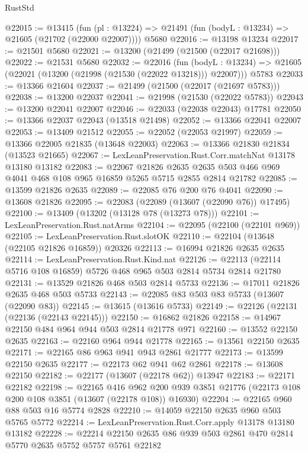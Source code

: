 \begin{lexlean}{RustStd}
\begin{coremodule}
@22015 := @13415
    (fun (pl : @13224) => @21491 (fun (bodyL : @13234) => @21605 (@21702 (@22000 @22007))))
    @5680
@22016 := @13198 @13234
@22017 := @21501 @5680
@22021 := @13200 (@21499 (@21500 (@22017 @21698)))
@22022 := @21531 @5680
@22032 := @22016
    (fun (bodyL : @13234) => @21605 (@22021 (@13200 (@21998 (@21530 (@22022 @13218))) @22007)))
    @5783
@22033 := @13366 @21604
@22037 := @21499 (@21500 (@22017 (@21697 @5783)))
@22038 := @13200 @22037
@22041 := @21998 (@21530 (@22022 @5783))
@22043 := @13200 @22041 @22007
@22046 := @22033 (@22038 @22043) @17781
@22050 := @13366 @22037 @22043 (@13518 @21498)
@22052 := @13366 @22041 @22007
@22053 := @13409 @21512
@22055 := @22052 (@22053 @21997)
@22059 := @13366 @22005 @21835 (@13648 @22003)
@22063 := @13366 @21830 @21834 (@13523 @21665)
@22067 := LexLeanPreservation.Rust.Corr.matchNat @13178 @13180 @13182
@22083 := @22067
    @21826
    @2635
    @2635
    @503
    @466
    @969
    @4041
    @468
    @108
    @965
    @16859
    @5265
    @5715
    @2855
    @2814
    @21782
@22085 := @13599 @21826 @2635
@22089 := @22085 @76 @200 @76 @4041
@22090 := @13608 @21826
@22095 := @22083 (@22089 (@13607 (@22090 @76)) @17495)
@22100 := @13409 (@13202 (@13128 @78 (@13273 @78)))
@22101 := LexLeanPreservation.Rust.natArms
@22104 := @22095 (@22100 (@22101 @969))
@22105 := LexLeanPreservation.Rust.slotOK
@22110 := @22104 (@13648 (@22105 @21826 @16859)) @20326
@22113 := @16994 @21826 @2635 @2635
@22114 := LexLeanPreservation.Rust.Kind.nat
@22126 := @22113 (@22114 @5716 @108 @16859) @5726 @468 @965 @503 @2814 @5734 @2814 @21780
@22131 := @13529 @21826 @468 @503 @2814 @5733
@22136 := @17011 @21826 @2635 @468 @503 @5733
@22143 := @22085 @83 @503 @83 @5733 (@13607 (@22090 @83))
@22145 := @13615 (@13616 @5733)
@22149 := @22126 (@22131 (@22136 (@22143 @22145)))
@22150 := @16862 @21826
@22158 := @14967 @22150 @484 @964 @944 @503 @2814 @21778 @971
@22160 := @13552 @22150 @2635
@22163 := @22160 @964 @944 @21778
@22165 := @13561 @22150 @2635
@22171 := @22165 @86 @963 @941 @943 @2861 @21777
@22173 := @13599 @22150 @2635
@22177 := @22173 @62 @941 @62 @2861
@22178 := @13608 @22150
@22182 := @22177 (@13607 (@22178 @62)) @13947
@22183 := @22171 @22182
@22198 := @22165
    @416
    @962
    @200
    @939
    @3851
    @21776
    (@22173 @108 @200 @108 @3851 (@13607 (@22178 @108)) @16930)
@22204 := @22165 @960 @88 @503 @16 @5774 @2828
@22210 := @14059 @22150 @2635 @960 @503 @5765 @5772
@22214 := LexLeanPreservation.Rust.Corr.apply @13178 @13180 @13182
@22228 := @22214 @22150 @2635 @86 @939 @503 @2861 @470 @2814 @5770 @2635 @5752 @5757 @5761 @22182

\end{coremodule}
\end{lexlean}
